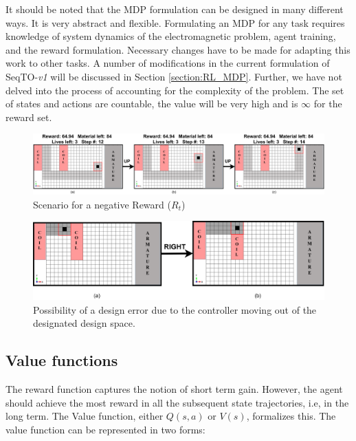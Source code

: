 It should be noted that the MDP formulation can be designed in many different ways. It is very abstract and flexible. Formulating an MDP for any task requires knowledge of system dynamics of the electromagnetic problem, agent training, and the reward formulation. Necessary changes have to be made for adapting this work to other tasks. A number of modifications in the current formulation of SeqTO-\textit{v1} will be discussed in Section \ref{section:RL_MDP}. Further, we have not delved into the process of accounting for the complexity of the problem. The set of states and actions are countable, the value will be very high and is $\infty$ for the reward set. 

\begin{figure}[h!]
    \centering
    \includegraphics[width=\textwidth]{Figures/Ch_RL/c_core_negative_error.png}
    \caption{Scenario for a negative Reward ($R_t$)}
    \label{fig:RL_neg_reward}
\end{figure}

\begin{figure}[h!]
    \centering
    \includegraphics[width=\textwidth]{Figures/Ch_RL/Coil_error.png}
    \caption{Possibility of a design error due to the controller moving out of the designated design space.}
    \label{fig:RL_coil_error}
\end{figure}

\subsection{Value functions}
\label{section:MDP_QL-Value_Function}

The reward function captures the notion of short term gain. However, the agent should achieve the most reward in all the subsequent state trajectories, i.e, in the long term. The Value function, either $Q(s,a)$ or $V(s)$, formalizes this. The value function can be represented in two forms:

